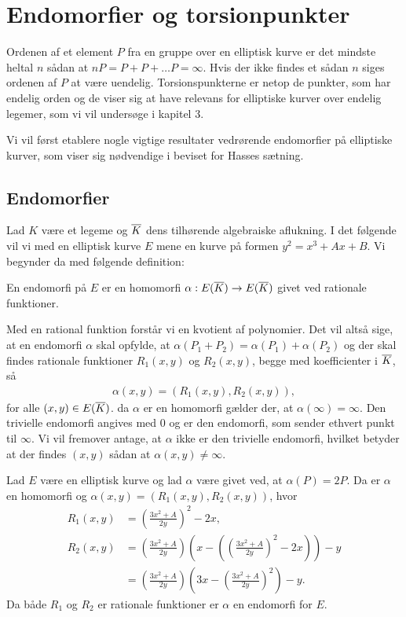 \chapter{Endomorfier og torsionpunkter}

Ordenen af et element $P$ fra en gruppe over en elliptisk kurve er det mindste heltal $n$ sådan at 
$nP = P + P + \ldots P = \infty$. Hvis der ikke findes et sådan $n$ siges ordenen af $P$ at være uendelig. Torsionspunkterne er netop de punkter, som har endelig orden og de viser sig at have relevans for elliptiske kurver over endelig legemer, som vi vil undersøge i kapitel 3.

Vi vil først etablere nogle vigtige resultater vedrørende endomorfier på elliptiske kurver, som viser sig nødvendige i beviset for Hasses sætning.

\section{Endomorfier}
Lad $K$ være et legeme og $\overline{K}$ dens tilhørende algebraiske aflukning. I det følgende vil vi med en elliptisk kurve $E$ mene en kurve på formen $y^2 = x^3 + Ax + B$. 
Vi begynder da med følgende definition:

\begin{definition}
En endomorfi på $E$ er en homomorfi $\alpha : E(\overline{K}) \to E(\overline{K})$ givet
ved rationale funktioner.
\end{definition}

Med en rational funktion forstår vi en kvotient af polynomier. Det vil altså sige, at 
en endomorfi $\alpha$ skal opfylde, at $\alpha(P_1 + P_2) = \alpha(P_1) + \alpha(P_2)$ 
og der skal findes rationale 
funktioner $R_1(x, y)$ og $R_2(x, y)$, begge med koefficienter i $\overline{K}$, så
\begin{align*}
	\alpha(x, y) = (R_1(x, y), R_2(x, y)),
\end{align*}
for alle $(x, y) \in E(\overline{K})$. da $\alpha$ er en homomorfi gælder der, at $\alpha(\infty)=\infty$. Den trivielle endomorfi angives med $0$ og er den endomorfi, som sender ethvert punkt til $\infty$. Vi vil fremover antage, at $\alpha$ ikke er den trivielle endomorfi, hvilket betyder at der findes $(x, y)$ sådan at $\alpha(x, y) \neq \infty$.

\begin{example}
Lad $E$ være en elliptisk kurve og lad $\alpha$ være givet ved, at $\alpha(P)=2P$. Da er $\alpha$ en homomorfi og
$\alpha(x, y) = (R_1(x, y), R_2(x, y))$, hvor
\begin{align*}
	R_1(x, y) &= \left( \frac{3x^2 + A}{2y} \right)^2 - 2x, \\
	R_2(x, y) &= \left( \frac{3x^2 + A}{2y} \right) \left(x - \left( \left( \frac{3x^2 + A}{2y} \right)^2 - 
	2x \right) \right) - y \\
	&= \left( \frac{3x^2 + A}{2y} \right) \left(3x - \left( \frac{3x^2 + A}{2y} \right)^2 \right) - y.
\end{align*}
Da både $R_1$ og $R_2$ er rationale funktioner er $\alpha$ en endomorfi for $E$.
\end{example}


